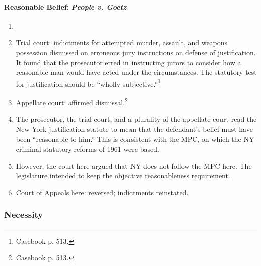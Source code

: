 \paragraph{Reasonable Belief: \emph{People v. Goetz}}

\begin{enumerate}
    \item 
    \item Trial court: indictments for attempted murder, assault, and weapons possession dismissed on erroneous jury instructions on defense of justification. It found that the prosecutor erred in instructing jurors to consider how a reasonable man would have acted under the circumstances. The statutory test for justification should be ``wholly subjective.''\footnote{Casebook p. 513.}
    \item Appellate court: affirmed dismissal.\footnote{Casebook p. 513.}
    \item The prosecutor, the trial court, and a plurality of the appellate court read the New York justification statute to mean that the defendant's belief must have been ``reasonable to him.'' This is consistent with the MPC, on which the NY criminal statutory reforms of 1961 were based.
    \item However, the court here argued that NY does not follow the MPC here. The legislature intended to keep the objective reasonableness requirement.
    \item Court of Appeals here: reversed; indictments reinstated.
\end{enumerate}

% 
% 
% 

\subsubsection{Necessity}

